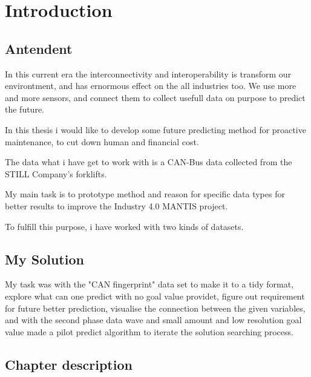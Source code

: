 \chapter*{Introduction}
\section{Antendent}
In this current era the interconnectivity and interoperability is transform our environtment, and has ernormous effect on the all industries too. We use more and more sensors, and connect them to collect usefull data on purpose to predict the future.

In this thesis i would like to develop some future predicting method for proactive maintenance, to cut down human and financial cost.

The data what i have get to work with is a CAN-Bus data collected from the STILL Company's forklifts.

My main task is to prototype method and reason for specific data types for better results to improve the Industry 4.0 MANTIS project.

To fulfill this purpose, i have worked with two kinds of datasets.
\section{My Solution}
My task was with the "CAN fingerprint" data set to make it to a tidy format, explore what can one predict with no goal value providet, figure out requirement for future better prediction, visualise the connection between the given variables, and with the second phase data wave and small amount and low resolution goal value made a pilot predict algorithm to iterate the solution searching process. 


\section{Chapter description}
